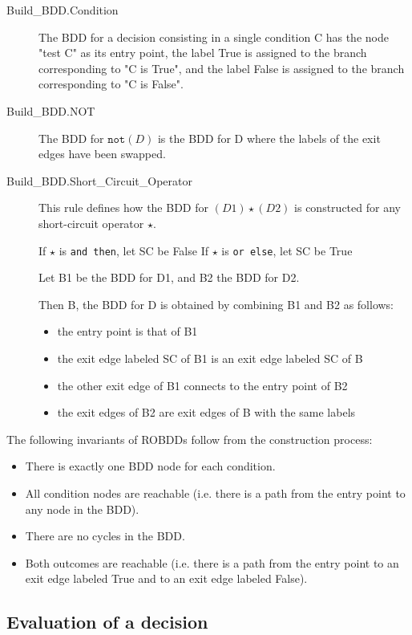 \documentclass[a4paper,12pt,twoside]{article}
\newcommand{\anysc}{\star}
\newcommand{\andthen}{\texttt{and then}}
\newcommand{\orelse}{\texttt{or else}}
\newcommand{\adanot}{\texttt{not}}
\begin{document}
\begin{description}
\item[Build\_BDD.Condition]
  The BDD for a decision consisting in a single condition C has the node
  "test C" as its entry point, the label True is assigned to the branch
  corresponding to "C is True", and the label False is assigned to the
  branch corresponding to "C is False".

\item[Build\_BDD.NOT]
  The BDD for $\adanot{} (D)$ is the BDD for D where the labels of the exit
  edges have been swapped.

\item[Build\_BDD.Short\_Circuit\_Operator]
  This rule defines how the BDD for $(D1) \anysc{} (D2)$ is constructed for
  any short-circuit operator $\anysc{}$.

  If $\anysc{}$ is \andthen{}, let SC be False
  If $\anysc{}$ is \orelse{}, let SC be True

  Let B1 be the BDD for D1, and B2 the BDD for D2.

  Then B, the BDD for D is obtained by combining B1 and B2 as follows:
  \begin{itemize}
    \item the entry point is that of B1
    \item the exit edge labeled SC of B1 is an exit edge labeled SC of B
    \item the other exit edge of B1 connects to the entry point of B2
    \item the exit edges of B2 are exit edges of B with the same labels
  \end{itemize}
\end{description}

The following invariants of ROBDDs follow from the construction process:
\begin{itemize}
  \item There is exactly one BDD node for each condition.
  \item All condition nodes are reachable (i.e. there is a path from
        the entry point to any node in the BDD).
  \item There are no cycles in the BDD.
  \item Both outcomes are reachable (i.e. there is a path from the entry point
        to an exit edge labeled True and to an exit edge labeled False).
\end{itemize}

\subsection{Evaluation of a decision}
\end{document}
